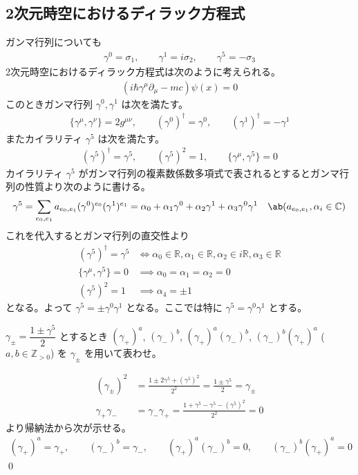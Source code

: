\documentclass[uplatex,dvipdfmx,a4paper,11pt]{jlreq}
\makeatletter
\theoremstyle{definition}
\renewenvironment{proof}[1][\proofname]{\par
  \normalfont
  \topsep6\p@\@plus6\p@ \trivlist
  \item[\hskip\labelsep{\bfseries #1}\@addpunct{\bfseries}]\ignorespaces\quad\par
}{%
  \qed\endtrivlist\@endpefalse
}
\renewcommand\proofname{証明}
\newcommand{\CC}{\mathbb{C}}
\newcommand{\RR}{\mathbb{R}}
\newcommand{\ZZ}{\mathbb{Z}}
\numberwithin{equation}{section}
\makeatother
\begin{document}
\subsection{2次元時空におけるディラック方程式}
ガンマ行列についても
\begin{align}
  \gamma^0 = \sigma_1, \qquad \gamma^1 = i\sigma_2, \qquad \gamma^5 = -\sigma_3
\end{align}
2次元時空におけるディラック方程式は次のように考えられる。
\begin{align}
  (i\hbar\gamma^\mu\partial_\mu - mc)\psi(x) = 0
\end{align}
このときガンマ行列 $\gamma^0, \gamma^1$ は次を満たす。
\begin{align}
  \lbrace\gamma^\mu, \gamma^\nu\rbrace = 2g^{\mu\nu}, \qquad (\gamma^0)^\dagger = \gamma^0, \qquad (\gamma^1)^\dagger = - \gamma^1
\end{align}
またカイラリティ $\gamma^5$ は次を満たす。
\begin{align}
  (\gamma^5)^\dagger = \gamma^5, \qquad (\gamma^5)^2 = 1, \qquad \lbrace\gamma^\mu, \gamma^5\rbrace = 0
\end{align}
カイラリティ $\gamma^5$ がガンマ行列の複素数係数多項式で表されるとするとガンマ行列の性質より次のように書ける。
\begin{align}
  \gamma^5 & = \sum_{e_0, e_1}a_{e_0,e_1}(\gamma^0)^{e_0}(\gamma^1)^{e_1} = \alpha_0 + \alpha_1\gamma^0 + \alpha_2\gamma^1 + \alpha_3\gamma^0\gamma^1 & \ab(a_{e_0, e_1}, \alpha_i\in\CC)
\end{align}
これを代入するとガンマ行列の直交性より
\begin{align}
  (\gamma^5)^\dagger = \gamma^5          & \iff \alpha_0\in\RR, \alpha_1\in\RR, \alpha_2\in i\RR, \alpha_3\in\RR \\
  \lbrace\gamma^\mu, \gamma^5\rbrace = 0 & \implies \alpha_0 = \alpha_1 = \alpha_2 = 0                           \\
  (\gamma^5)^2 = 1                       & \implies \alpha_4 = \pm 1
\end{align}
となる。よって $\gamma^5 = \pm \gamma^0\gamma^1$ となる。ここでは特に $\gamma^5 = \gamma^0\gamma^1$ とする。

\begin{problem}
$\gamma_\pm = \dfrac{1 \pm \gamma^5}{2}$ とするとき $(\gamma_+)^a$, $(\gamma_-)^b$, $(\gamma_+)^a(\gamma_-)^b$, $(\gamma_-)^b(\gamma_+)^a$ ($a, b\in\ZZ_{>0}$) を $\gamma_\pm$ を用いて表わせ。
\end{problem}
\begin{proof}
  \begin{align}
    (\gamma_\pm)^2   & = \frac{1 \pm 2\gamma^5 + (\gamma^5)^2}{2^2} = \frac{1 \pm \gamma^5}{2} = \gamma_\pm \\
    \gamma_+\gamma_- & = \gamma_-\gamma_+ = \frac{1 + \gamma^5 - \gamma^5 - (\gamma^5)^2}{2^2} = 0
  \end{align}
  より帰納法から次が示せる。
  \begin{align}
    (\gamma_+)^a = \gamma_+, \qquad (\gamma_-)^b = \gamma_-, \qquad (\gamma_+)^a(\gamma_-)^b = 0, \qquad (\gamma_-)^b(\gamma_+)^a = 0
  \end{align}
\end{proof}
\end{document}
